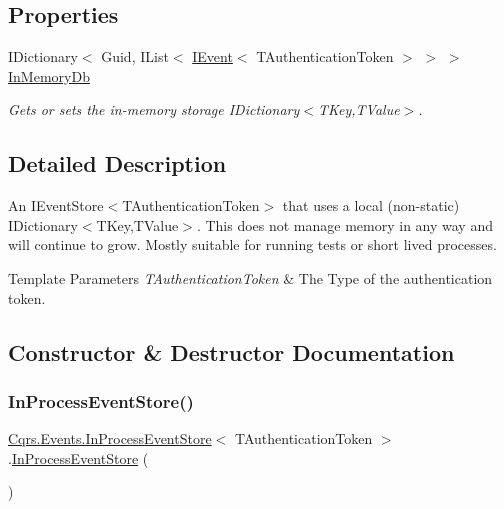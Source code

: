 \subsection*{Properties}
\begin{DoxyCompactItemize}
\item 
I\+Dictionary$<$ Guid, I\+List$<$ \hyperlink{interfaceCqrs_1_1Events_1_1IEvent}{I\+Event}$<$ T\+Authentication\+Token $>$ $>$ $>$ \hyperlink{classCqrs_1_1Events_1_1InProcessEventStore_a4d0dee81baa7348a2d16fd0878220bd4_a4d0dee81baa7348a2d16fd0878220bd4}{In\+Memory\+Db}
\begin{DoxyCompactList}\small\item\em Gets or sets the in-\/memory storage I\+Dictionary$<$\+T\+Key,\+T\+Value$>$. \end{DoxyCompactList}\end{DoxyCompactItemize}


\subsection{Detailed Description}
An I\+Event\+Store$<$\+T\+Authentication\+Token$>$ that uses a local (non-\/static) I\+Dictionary$<$\+T\+Key,\+T\+Value$>$. This does not manage memory in any way and will continue to grow. Mostly suitable for running tests or short lived processes. 


\begin{DoxyTemplParams}{Template Parameters}
{\em T\+Authentication\+Token} & The Type of the authentication token.\\
\hline
\end{DoxyTemplParams}


\subsection{Constructor \& Destructor Documentation}
\mbox{\label{classCqrs_1_1Events_1_1InProcessEventStore_a81534fc0086e307f46051c26111c47ab_a81534fc0086e307f46051c26111c47ab}} 
\subsubsection{\texorpdfstring{In\+Process\+Event\+Store()}{InProcessEventStore()}}
{\footnotesize\ttfamily \hyperlink{classCqrs_1_1Events_1_1InProcessEventStore}{Cqrs.\+Events.\+In\+Process\+Event\+Store}$<$ T\+Authentication\+Token $>$.\hyperlink{classCqrs_1_1Events_1_1InProcessEventStore}{In\+Process\+Event\+Store} (\begin{DoxyParamCaption}{ }\end{DoxyParamCaption})}



